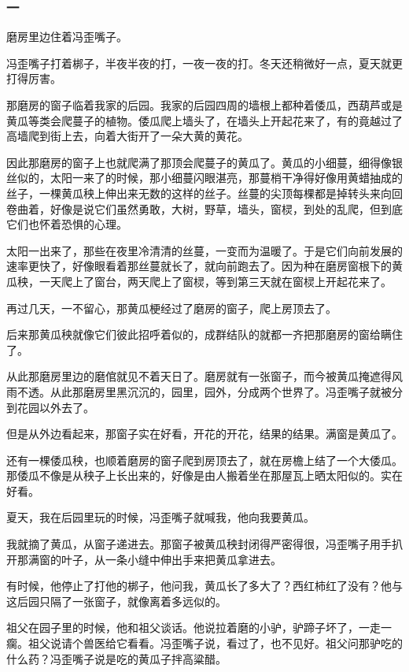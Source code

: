 \subsubsection*{一}
\par 磨房里边住着冯歪嘴子。
\par 冯歪嘴子打着梆子，半夜半夜的打，一夜一夜的打。冬天还稍微好一点，夏天就更打得厉害。
\par 那磨房的窗子临着我家的后园。我家的后园四周的墙根上都种着倭瓜，西葫芦或是黄瓜等类会爬蔓子的植物。倭瓜爬上墙头了，在墙头上开起花来了，有的竟越过了高墙爬到街上去，向着大街开了一朵大黄的黄花。
\par 因此那磨房的窗子上也就爬满了那顶会爬蔓子的黄瓜了。黄瓜的小细蔓，细得像银丝似的，太阳一来了的时候，那小细蔓闪眼湛亮，那蔓梢干净得好像用黄蜡抽成的丝子，一棵黄瓜秧上伸出来无数的这样的丝子。丝蔓的尖顶每棵都是掉转头来向回卷曲着，好像是说它们虽然勇敢，大树，野草，墙头，窗棂，到处的乱爬，但到底它们也怀着恐惧的心理。
\par 太阳一出来了，那些在夜里冷清清的丝蔓，一变而为温暖了。于是它们向前发展的速率更快了，好像眼看着那丝蔓就长了，就向前跑去了。因为种在磨房窗根下的黄瓜秧，一天爬上了窗台，两天爬上了窗棂，等到第三天就在窗棂上开起花来了。
\par 再过几天，一不留心，那黄瓜梗经过了磨房的窗子，爬上房顶去了。
\par 后来那黄瓜秧就像它们彼此招呼着似的，成群结队的就都一齐把那磨房的窗给瞒住了。
\par 从此那磨房里边的磨倌就见不着天日了。磨房就有一张窗子，而今被黄瓜掩遮得风雨不透。从此那磨房里黑沉沉的，园里，园外，分成两个世界了。冯歪嘴子就被分到花园以外去了。
\par 但是从外边看起来，那窗子实在好看，开花的开花，结果的结果。满窗是黄瓜了。
\par 还有一棵倭瓜秧，也顺着磨房的窗子爬到房顶去了，就在房檐上结了一个大倭瓜。那倭瓜不像是从秧子上长出来的，好像是由人搬着坐在那屋瓦上晒太阳似的。实在好看。
\par 夏天，我在后园里玩的时候，冯歪嘴子就喊我，他向我要黄瓜。
\par 我就摘了黄瓜，从窗子递进去。那窗子被黄瓜秧封闭得严密得很，冯歪嘴子用手扒开那满窗的叶子，从一条小缝中伸出手来把黄瓜拿进去。
\par 有时候，他停止了打他的梆子，他问我，黄瓜长了多大了？西红柿红了没有？他与这后园只隔了一张窗子，就像离着多远似的。
\par 祖父在园子里的时候，他和祖父谈话。他说拉着磨的小驴，驴蹄子坏了，一走一瘸。祖父说请个兽医给它看看。冯歪嘴子说，看过了，也不见好。祖父问那驴吃的什么药？冯歪嘴子说是吃的黄瓜子拌高粱醋。
